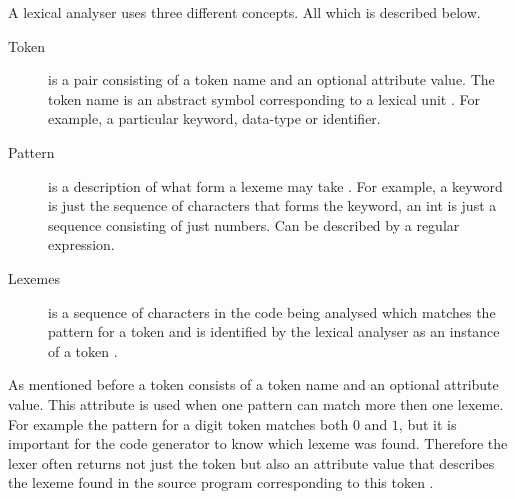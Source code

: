 A lexical analyser uses three different concepts. All which is described 
below. 
\begin{description}
  \item[Token]
    is a pair consisting of a token name and an optional attribute value. The 
token name is an abstract symbol corresponding to a lexical unit \cite{Aho2006}. 
For example, a particular keyword, data-type or identifier.
  \item[Pattern]
    is a description of what form a lexeme may take \cite{Aho2006}. 
For example, a keyword is just the sequence of characters that forms the 
keyword, an int is just a sequence consisting of just numbers. Can be described 
by a regular expression.
  \item[Lexemes]
    is a sequence of characters in the code being analysed which 
matches the pattern for a token and is identified by the lexical analyser as an 
instance of a token \cite{Aho2006}.
\end{description}
As mentioned before a token consists of a token name and an optional attribute value. 
This attribute is used when one pattern can match more then one lexeme.
For example the pattern for a digit token matches both $0$ and $1$, 
but it is important for the code generator to know which lexeme was found. 
Therefore the lexer often returns not just the token but also an attribute value 
that describes the lexeme found in the source program corresponding to this 
token \cite{Aho2006}.

